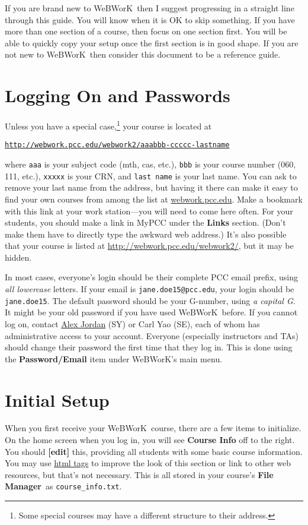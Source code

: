 \documentclass[12pt]{article}
\newcommand{\menu}[1]{\textbf{#1}}
\newcommand{\WW}{WeBWorK}
\newcommand{\FM}{\menu{File Manager}}
\begin{document}
If you are brand new to \WW\, then I suggest progressing in a straight line through this guide. You will know when it is OK to skip something. If you have more than one section of a course, then focus on one section first. You will be able to quickly copy your setup once the first section is in good shape. If you are not new to \WW\, then consider this document to be a reference guide.

\section{Logging On and Passwords}

Unless you have a special case,\footnote{Some special courses may have a different structure to their address.} your course is located at \begin{center}\href{http://webwork.pcc.edu/webwork2/}{\texttt{http://webwork.pcc.edu/webwork2/aaabbb-ccccc-lastname}} \end{center} where \texttt{aaa} is your subject code (mth, cas, etc.), \texttt{bbb} is your course number (060, 111, etc.),  \texttt{xxxxx} is your CRN, and \texttt{last name} is your last name. You can ask to remove your last name from the address, but having it there can make it easy to find your own courses from among the list at \url{webwork.pcc.edu}. Make a bookmark with this link at your work station---you will need to come here often. For your students, you should make a link in MyPCC under the \menu{Links} section. (Don't make them have to directly type the awkward web address.) It's also possible that your course is listed at \href{http://webwork.pcc.edu/webwork2/}{http://webwork.pcc.edu/webwork2/}, but it may be hidden.

In most cases, everyone's login should be their complete PCC email prefix, using \emph{all lowercase} letters.  If your email is \texttt{jane.doe15@pcc.edu}, your login should be \texttt{jane.doe15}.  The default password should be your G-number, using \emph{a capital G}.  It might be your old password if you have used \WW\ before.  If you cannot log on, contact \href{mailto:alex.jordan@pcc.edu}{Alex Jordan} (SY) or Carl Yao (SE), each of whom has administrative access to your account.  Everyone (especially instructors and TAs) should change their password the first time that they log in.  This is done using the \menu{Password/Email} item under \WW's main menu.


\section{Initial Setup}
When you first receive your \WW\ course, there are a few items to initialize.  On the home screen when you log in, you will see \menu{Course Info} off to the right.  You should \menu{[edit]} this, providing all students with some basic course information.  You may use \href{http://en.wikipedia.org/wiki/HTML_element}{html tags} to improve the look of this section or link to other web resources, but that's not necessary.  This is all stored in your course's \FM\  as \verb=course_info.txt=. 
\end{document}
